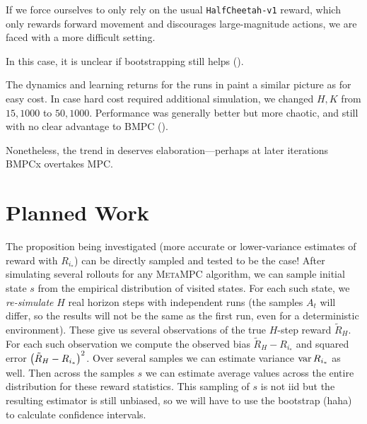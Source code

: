 \documentclass{article}
\begin{document}
If we force ourselves to only rely on the usual \texttt{HalfCheetah-v1} reward, which only rewards forward movement and discourages large-magnitude actions, we are faced with a more difficult setting.

In this case, it is unclear if bootstrapping still helps ().


The dynamics and learning returns for the runs in  paint a similar picture as for easy cost. In case hard cost required additional simulation, we changed $H,K$ from $15,1000$ to $50,1000$. Performance was generally better but more chaotic, and still with no clear advantage to \textsc{BMPC} ().


Nonetheless, the trend in  deserves elaboration---perhaps at later iterations \textsc{BMPC}x overtakes MPC.

\section{Planned Work}

The proposition being investigated (more accurate or lower-variance estimates of reward with $R_{i_*}$) can be directly sampled and tested to be the case! After simulating several rollouts for any \textsc{MetaMPC} algorithm, we can sample initial state $s$ from the empirical distribution of visited states. For each such state, we \textit{re-simulate} $H$ real horizon steps with independent runs (the samples $A_t$ will differ, so the results will not be the same as the first run, even for a deterministic environment). These give us several observations of the true $H$-step reward $\tilde{R}_H$. For each such observation we compute the observed bias $\tilde{R}_H-R_{i_*}$ and squared error $\left({\tilde{R}_H-R_{i_*}}\right)^2$. Over several samples we can estimate variance $\operatorname{var} R_{i_*}$ as well. Then across the samples $s$ we can estimate average values across the entire distribution for these reward statistics. This sampling of $s$ is not iid but the resulting estimator is still unbiased, so we will have to use the bootstrap (haha) to calculate confidence intervals.
\end{document}
